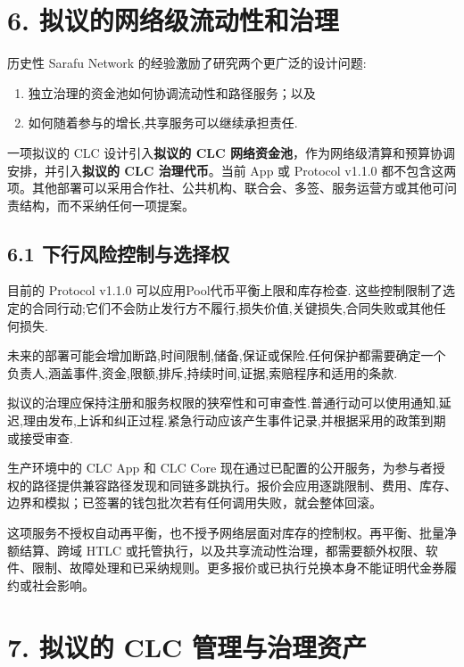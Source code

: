 \documentclass[11pt]{article}
\begin{document}
\section*{6. 拟议的网络级流动性和治理}

历史性 Sarafu Network 的经验激励了研究两个更广泛的设计问题:

\begin{enumerate}[leftmargin=*]
\item 独立治理的资金池如何协调流动性和路径服务；以及
\item 如何随着参与的增长,共享服务可以继续承担责任.
\end{enumerate}
一项拟议的 CLC 设计引入\textbf{拟议的 CLC 网络资金池}，作为网络级清算和预算协调安排，并引入\textbf{拟议的 CLC 治理代币}。当前 App 或 Protocol v1.1.0 都不包含这两项。其他部署可以采用合作社、公共机构、联合会、多签、服务运营方或其他可问责结构，而不采纳任何一项提案。

\subsection*{6.1 下行风险控制与选择权}

目前的 Protocol v1.1.0 可以应用Pool代币平衡上限和库存检查. 这些控制限制了选定的合同行动;它们不会防止发行方不履行,损失价值,关键损失,合同失败或其他任何损失.

未来的部署可能会增加断路,时间限制,储备,保证或保险.任何保护都需要确定一个负责人,涵盖事件,资金,限额,排斥,持续时间,证据,索赔程序和适用的条款.

拟议的治理应保持注册和服务权限的狭窄性和可审查性.普通行动可以使用通知,延迟,理由发布,上诉和纠正过程.紧急行动应该产生事件记录,并根据采用的政策到期或接受审查.

生产环境中的 CLC App 和 CLC Core 现在通过已配置的公开服务，为参与者授权的路径提供兼容路径发现和同链多跳执行。报价会应用逐跳限制、费用、库存、边界和模拟；已签署的钱包批次若有任何调用失败，就会整体回滚。

这项服务不授权自动再平衡，也不授予网络层面对库存的控制权。再平衡、批量净额结算、跨域 HTLC 或托管执行，以及共享流动性治理，都需要额外权限、软件、限制、故障处理和已采纳规则。更多报价或已执行兑换本身不能证明代金券履约或社会影响。


\section*{7. 拟议的 CLC 管理与治理资产}
\end{document}
